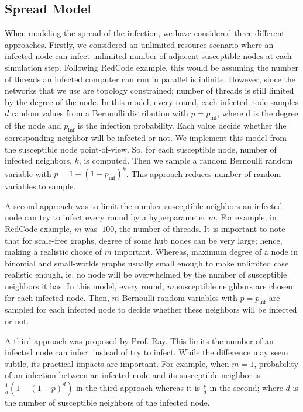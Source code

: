 \documentclass[conference]{IEEEtran}
\begin{document}
\subsection{Spread Model}\label{sec:spread_model}

When modeling the spread of the infection, we have considered three different approaches. Firstly, we considered an unlimited resource scenario where an infected node can infect unlimited number of adjacent susceptible nodes at each simulation step. Following RedCode example, this would be assuming the number of threads an infected computer can run in parallel is infinite. However, since the networks that we use are topology constrained; number of threads is still limited by the degree of the node. In this model, every round, each infected node samples $d$ random values from a Bernoulli distribution with $p = p_{\text{inf}}$, where d is the degree of the node and $p_{\text{inf}}$ is the infection probability. Each value decide whether the corresponding neighbor will be infected or not. We implement this model from the susceptible node point-of-view. So, for each susceptible node, number of infected neighbors, $k$, is computed. Then we sample a random Bernoulli random variable with $p = 1 - (1-p_{\text{inf}})^k$. This approach reduces number of random variables to sample.

A second approach was to limit the number susceptible neighbors an infected node can try to infect every round by a hyperparameter $m$. For example, in RedCode example, $m$ was $~100$, the number of threads. It is important to note that for scale-free graphs, degree of some hub nodes can be very large; hence, making a realistic choice of $m$ important. Whereas, maximum degree of a node in binomial and small-worlds graphs usually small enough to make unlimited case realistic enough, ie. no node will be overwhelmed by the number of susceptible neighbors it has. In this model, every round, $m$ susceptible neighbors are chosen for each infected node. Then, $m$ Bernoulli random variables with $p = p_{\text{inf}}$ are sampled for each infected node to decide whether these neighbors will be infected or not.

A third approach was proposed by Prof. Ray. This limits the number of an infected node can infect instead of try to infect. While the difference may seem subtle, its practical impacts are important. For example, when $m=1$, probability of an infection between an infected node and its susceptible neighbor is $\frac{1}{d}(1-(1-p)^d)$ in the third approach whereas it is $\frac{p}{d}$ in the second; where $d$ is the number of susceptible neighbors of the infected node.
\end{document}
